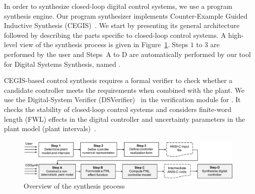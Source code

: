 \documentclass[twocolumn]{autart}    %
\begin{document}
In order to synthesize closed-loop digital control systems, we use a program
synthesis engine.  Our program synthesizer implements Counter-Example Guided
Inductive Synthesis (CEGIS)~\cite{DBLP:conf/asplos/Solar-LezamaTBSS06}.  We
start by presenting its general architecture followed by describing the
parts specific to closed-loop control systems.  A high-level view of the
synthesis process is given in Figure~\ref{DSSynth_process}.  Steps $1$ to
$3$ are performed by the user and Steps~A to D are automatically performed
by our tool for Digital Systems Synthesis, named \tool.

CEGIS-based control synthesis requires a formal verifier to check whether a
candidate controller meets the requirements when combined with the plant. 
We use the Digital-System Verifier (DSVerifier)~\cite{IsmailBCFF15} in the
verification module for \tool.  It checks the stability of closed-loop control systems and
considers finite-word length (FWL) effects in the digital controller and
uncertainty parameters in the plant model (plant intervals)~\cite{Bessa16}.   

%

\begin{figure}[t]
\centering
\includegraphics[width=\textwidth]{figures/synthesis-flow.pdf}
\vspace{0.1cm}
\caption{Overview of the synthesis process\label{DSSynth_process}}
\end{figure}

\end{document}
